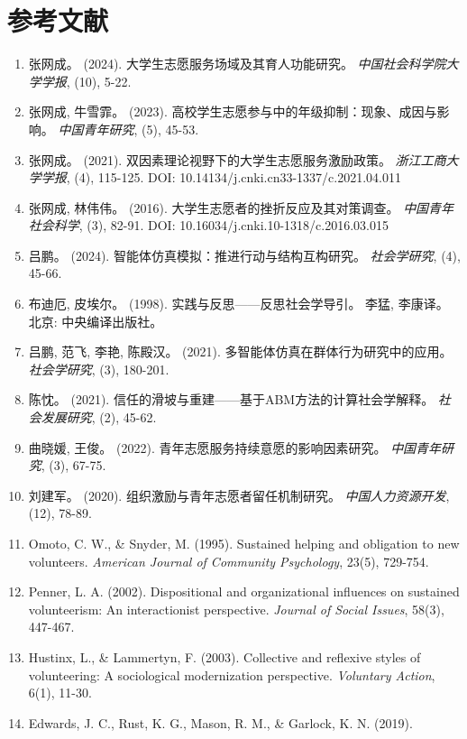 \documentclass[12pt,a4paper]{article}
\begin{document}
\section{参考文献}
\small
\begin{enumerate}\setlength{\itemsep}{0pt}\setlength{\parskip}{0.05em}
  \item 张网成。 (2024). 大学生志愿服务场域及其育人功能研究。
    \textit{中国社会科学院大学学报}, (10), 5-22.
  \item 张网成, 牛雪霏。 (2023). 高校学生志愿参与中的年级抑制：现象、成因与影响。
    \textit{中国青年研究}, (5), 45-53.
  \item 张网成。 (2021). 双因素理论视野下的大学生志愿服务激励政策。
    \textit{浙江工商大学学报}, (4), 115-125.
    DOI: 10.14134/j.cnki.cn33-1337/c.2021.04.011
  \item 张网成, 林伟伟。 (2016). 大学生志愿者的挫折反应及其对策调查。
    \textit{中国青年社会科学}, (3), 82-91.
    DOI: 10.16034/j.cnki.10-1318/c.2016.03.015
  \item 吕鹏。 (2024). 智能体仿真模拟：推进行动与结构互构研究。
    \textit{社会学研究}, (4), 45-66.
  \item 布迪厄, 皮埃尔。 (1998). 实践与反思——反思社会学导引。
    李猛, 李康译。 北京: 中央编译出版社。
  \item 吕鹏, 范飞, 李艳, 陈殿汉。 (2021). 多智能体仿真在群体行为研究中的应用。
    \textit{社会学研究}, (3), 180-201.
  \item 陈忱。 (2021). 信任的滑坡与重建——基于ABM方法的计算社会学解释。
    \textit{社会发展研究}, (2), 45-62.
  \item 曲晓媛, 王俊。 (2022). 青年志愿服务持续意愿的影响因素研究。
    \textit{中国青年研究}, (3), 67-75.
  \item 刘建军。 (2020). 组织激励与青年志愿者留任机制研究。
    \textit{中国人力资源开发}, (12), 78-89.
  \item Omoto, C. W., \& Snyder, M. (1995). Sustained helping and obligation to new
    volunteers. \textit{American Journal of Community Psychology}, 23(5), 729-754.
  \item Penner, L. A. (2002). Dispositional and organizational influences on sustained
    volunteerism: An interactionist perspective. \textit{Journal of Social Issues}, 58(3), 447-467.
  \item Hustinx, L., \& Lammertyn, F. (2003). Collective and reflexive styles of
    volunteering: A sociological modernization perspective. \textit{Voluntary Action}, 6(1), 11-30.
  \item Edwards, J. C., Rust, K. G., Mason, R. M., \& Garlock, K. N. (2019).

\end{enumerate}
\end{document}
